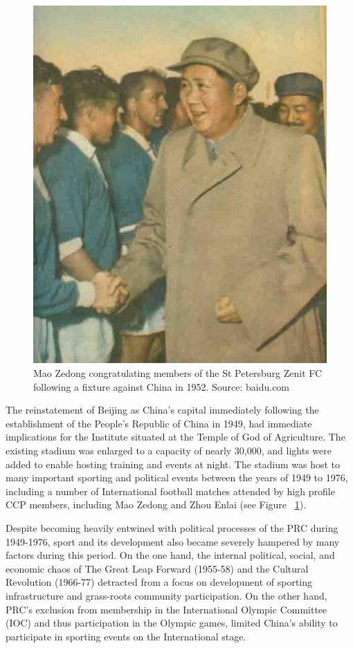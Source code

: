 \begin{CJK}{UTF8}{gbsn}
\begin{figure}[htbp]
  \centering
  \includegraphics[scale=.5]{images/maoXNT.jpg}
  \caption{Mao Zedong congratulating members of the St Petersburg Zenit FC following a fixture against China in 1952. Source: baidu.com}
  \label{fig:maoXNT}
\end{figure}

The reinstatement of Beijing as China's capital immediately following the establishment of the People's Republic of China in 1949, had immediate implications for the Institute situated at the Temple of God of Agriculture.  The existing stadium was enlarged to a capacity of nearly 30,000, and lights were added to enable hosting training and events at night.  The stadium was host to many important sporting and political events between the years of 1949 to 1976, including a number of International football matches attended by high profile CCP members, including Mao Zedong and Zhou Enlai (see Figure ~\ref{fig:maoXNT}).

Despite becoming heavily entwined with political processes of the PRC during 1949-1976, sport and its development also became severely hampered by many factors during this period.  On the one hand, the internal political, social, and economic chaos of The Great Leap Forward (1955-58) and the Cultural Revolution (1966-77) detracted from a focus on development of sporting infrastructure and grass-roots community participation.  On the other hand, PRC's exclusion from membership in the International Olympic Committee (IOC) and thus participation in the Olympic games, limited China's ability to participate in sporting events on the International stage.







\end{CJK}
